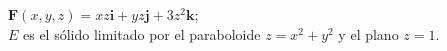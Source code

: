 \item $\mathbf{F}(x, y, z) = xz\mathbf{i} + yz\mathbf{j} + 3z^2\mathbf{k}$;\\
    $E$ es el sólido limitado por el paraboloide $z = x^2 + y^2$ y el plano $z = 1$.
